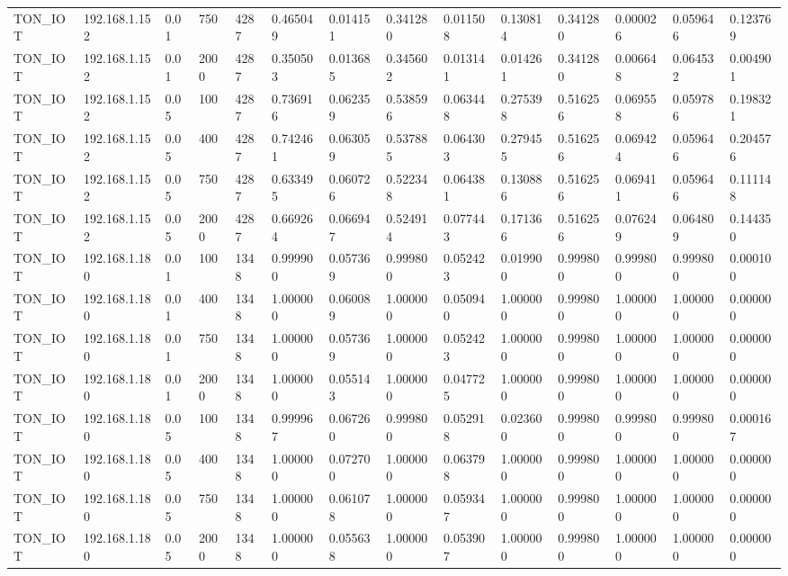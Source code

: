 \begin{tabular}{llllllllllllll}
TON\_IOT & 192.168.1.152 & 0.01 & 750 & 4287 & 0.465049 & 0.014151 & 0.341280 & 0.011508 & 0.130814 & 0.341280 & 0.000026 & 0.059646 & 0.123769 \\
TON\_IOT & 192.168.1.152 & 0.01 & 2000 & 4287 & 0.350503 & 0.013685 & 0.345602 & 0.013141 & 0.014261 & 0.341280 & 0.006648 & 0.064532 & 0.004901 \\
TON\_IOT & 192.168.1.152 & 0.05 & 100 & 4287 & 0.736916 & 0.062359 & 0.538596 & 0.063448 & 0.275398 & 0.516256 & 0.069558 & 0.059786 & 0.198321 \\
TON\_IOT & 192.168.1.152 & 0.05 & 400 & 4287 & 0.742461 & 0.063059 & 0.537885 & 0.064303 & 0.279455 & 0.516256 & 0.069424 & 0.059646 & 0.204576 \\
TON\_IOT & 192.168.1.152 & 0.05 & 750 & 4287 & 0.633495 & 0.060726 & 0.522348 & 0.064381 & 0.130886 & 0.516256 & 0.069411 & 0.059646 & 0.111148 \\
TON\_IOT & 192.168.1.152 & 0.05 & 2000 & 4287 & 0.669264 & 0.066947 & 0.524914 & 0.077443 & 0.171366 & 0.516256 & 0.076249 & 0.064809 & 0.144350 \\
TON\_IOT & 192.168.1.180 & 0.01 & 100 & 1348 & 0.999900 & 0.057369 & 0.999800 & 0.052423 & 0.019900 & 0.999800 & 0.999800 & 0.999800 & 0.000100 \\
TON\_IOT & 192.168.1.180 & 0.01 & 400 & 1348 & 1.000000 & 0.060089 & 1.000000 & 0.050940 & 1.000000 & 0.999800 & 1.000000 & 1.000000 & 0.000000 \\
TON\_IOT & 192.168.1.180 & 0.01 & 750 & 1348 & 1.000000 & 0.057369 & 1.000000 & 0.052423 & 1.000000 & 0.999800 & 1.000000 & 1.000000 & 0.000000 \\
TON\_IOT & 192.168.1.180 & 0.01 & 2000 & 1348 & 1.000000 & 0.055143 & 1.000000 & 0.047725 & 1.000000 & 0.999800 & 1.000000 & 1.000000 & 0.000000 \\
TON\_IOT & 192.168.1.180 & 0.05 & 100 & 1348 & 0.999967 & 0.067260 & 0.999800 & 0.052918 & 0.023600 & 0.999800 & 0.999800 & 0.999800 & 0.000167 \\
TON\_IOT & 192.168.1.180 & 0.05 & 400 & 1348 & 1.000000 & 0.072700 & 1.000000 & 0.063798 & 1.000000 & 0.999800 & 1.000000 & 1.000000 & 0.000000 \\
TON\_IOT & 192.168.1.180 & 0.05 & 750 & 1348 & 1.000000 & 0.061078 & 1.000000 & 0.059347 & 1.000000 & 0.999800 & 1.000000 & 1.000000 & 0.000000 \\
TON\_IOT & 192.168.1.180 & 0.05 & 2000 & 1348 & 1.000000 & 0.055638 & 1.000000 & 0.053907 & 1.000000 & 0.999800 & 1.000000 & 1.000000 & 0.000000 \\

\end{tabular}
